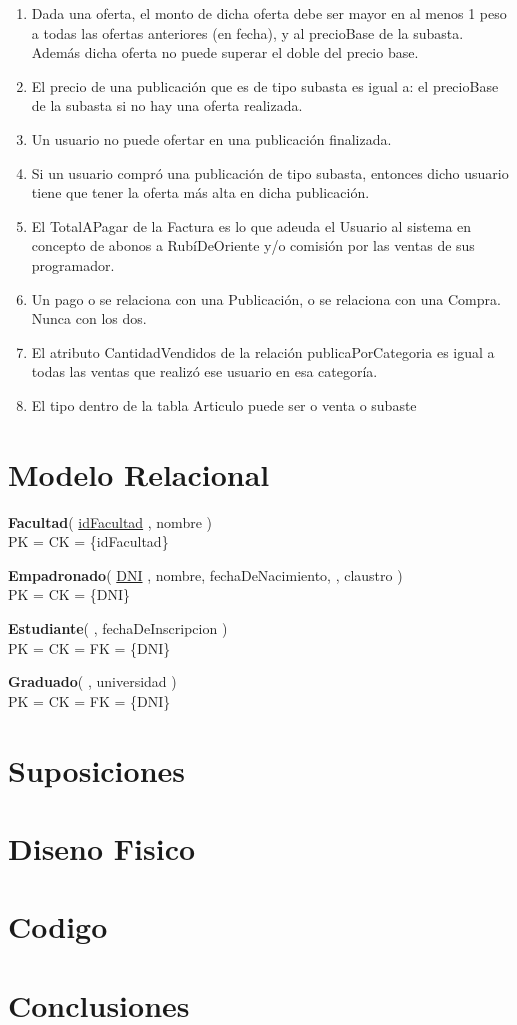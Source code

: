 \documentclass[a4paper, 10pt, twoside]{article}
\newcommand{\relacion}[3]{
  \noindent
  \textbf{#1}(\ignorespaces#2\unskip) \\
  #3
  \vspace{0.5em}
}
\newcommand{\pk}[1]{%
  \underline{#1}%
}
\newcommand{\fk}[1]{%
  \uwave{#1}%
}
\newcommand{\pkfk}[1]{%
  \pk{\fk{#1}}%
}
\newcommand{\clavespkck}[1]{
  PK = CK = \{#1\}
}
\newcommand{\clavespkckfk}[1]{
  PK = CK = FK = \{#1\}
}
\begin{document}
\begin{enumerate}
\item Dada una oferta, el monto de dicha oferta debe ser mayor en al menos 1 peso a todas las ofertas anteriores (en fecha), y al precioBase de la subasta. Adem\'as dicha oferta no puede superar el doble del precio base.
\item El precio de una publicaci\'on que es de tipo subasta es igual a:
el precioBase de la subasta si no hay una oferta realizada.

\item  Un usuario no puede ofertar en una publicaci\'on finalizada. 
\item  Si un usuario compr\'o una publicaci\'on de tipo subasta, entonces dicho usuario tiene que tener la oferta m\'as alta en dicha publicaci\'on. 
\item El TotalAPagar de la Factura es lo que adeuda el Usuario al sistema en concepto de abonos a Rub\'iDeOriente y/o comisi\'on por las ventas de sus programador. 
\item Un pago o se relaciona con una Publicaci\'on, o se relaciona con una Compra. Nunca con los dos.
\item El atributo CantidadVendidos de la relaci\'on publicaPorCategoria es igual a todas las ventas que realiz\'o ese usuario en esa categor\'ia.
\item El tipo dentro de la tabla Articulo puede ser o venta o subaste 

\end{enumerate}




\section{Modelo Relacional}


\relacion{Facultad}{
  \pk{idFacultad},
  nombre
}{
  \clavespkck{idFacultad}
}

\relacion{Empadronado}{
  \pk{DNI},
  nombre,
  fechaDeNacimiento,
  \fk{idFacultad},
  claustro
}{
  \clavespkck{DNI}
}

\relacion{Estudiante}{
  \pkfk{DNI},
  fechaDeInscripcion
}{
  \clavespkckfk{DNI}
}

\relacion{Graduado}{
  \pkfk{DNI},
  universidad
}{
  \clavespkckfk{DNI}
}

\section{Suposiciones}

\section{Diseno Fisico}

\section{Codigo}

\section{Conclusiones}
\end{document}
